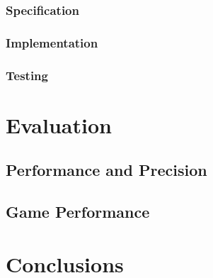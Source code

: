\documentclass[]{report}
\begin{document}
\subsection{Specification}

\subsection{Implementation}

\subsection{Testing}

\chapter{Evaluation}

\section{Performance and Precision}

\section{Game Performance}

\chapter{Conclusions}

\printbibliography
\end{document}
